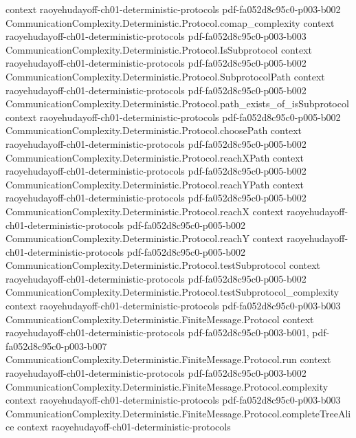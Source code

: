 \begin{lemma}
  {context}
  {raoyehudayoff-ch01-deterministic-protocols}
  {pdf-fa052d8c95c0-p003-b002}
\proofstep
  {CommunicationComplexity.Deterministic.Protocol.comap_complexity}
  {context}
  {raoyehudayoff-ch01-deterministic-protocols}
  {pdf-fa052d8c95c0-p003-b003}
\proofstep
  {CommunicationComplexity.Deterministic.Protocol.IsSubprotocol}
  {context}
  {raoyehudayoff-ch01-deterministic-protocols}
  {pdf-fa052d8c95c0-p005-b002}
\proofstep
  {CommunicationComplexity.Deterministic.Protocol.SubprotocolPath}
  {context}
  {raoyehudayoff-ch01-deterministic-protocols}
  {pdf-fa052d8c95c0-p005-b002}
\proofstep
  {CommunicationComplexity.Deterministic.Protocol.path_exists_of_isSubprotocol}
  {context}
  {raoyehudayoff-ch01-deterministic-protocols}
  {pdf-fa052d8c95c0-p005-b002}
\proofstep
  {CommunicationComplexity.Deterministic.Protocol.choosePath}
  {context}
  {raoyehudayoff-ch01-deterministic-protocols}
  {pdf-fa052d8c95c0-p005-b002}
\proofstep
  {CommunicationComplexity.Deterministic.Protocol.reachXPath}
  {context}
  {raoyehudayoff-ch01-deterministic-protocols}
  {pdf-fa052d8c95c0-p005-b002}
\proofstep
  {CommunicationComplexity.Deterministic.Protocol.reachYPath}
  {context}
  {raoyehudayoff-ch01-deterministic-protocols}
  {pdf-fa052d8c95c0-p005-b002}
\proofstep
  {CommunicationComplexity.Deterministic.Protocol.reachX}
  {context}
  {raoyehudayoff-ch01-deterministic-protocols}
  {pdf-fa052d8c95c0-p005-b002}
\proofstep
  {CommunicationComplexity.Deterministic.Protocol.reachY}
  {context}
  {raoyehudayoff-ch01-deterministic-protocols}
  {pdf-fa052d8c95c0-p005-b002}
\proofstep
  {CommunicationComplexity.Deterministic.Protocol.testSubprotocol}
  {context}
  {raoyehudayoff-ch01-deterministic-protocols}
  {pdf-fa052d8c95c0-p005-b002}
\proofstep
  {CommunicationComplexity.Deterministic.Protocol.testSubprotocol_complexity}
  {context}
  {raoyehudayoff-ch01-deterministic-protocols}
  {pdf-fa052d8c95c0-p003-b003}
\proofstep
  {CommunicationComplexity.Deterministic.FiniteMessage.Protocol}
  {context}
  {raoyehudayoff-ch01-deterministic-protocols}
  {pdf-fa052d8c95c0-p003-b001,
    pdf-fa052d8c95c0-p003-b007}
\proofstep
  {CommunicationComplexity.Deterministic.FiniteMessage.Protocol.run}
  {context}
  {raoyehudayoff-ch01-deterministic-protocols}
  {pdf-fa052d8c95c0-p003-b002}
\proofstep
  {CommunicationComplexity.Deterministic.FiniteMessage.Protocol.complexity}
  {context}
  {raoyehudayoff-ch01-deterministic-protocols}
  {pdf-fa052d8c95c0-p003-b003}
\proofstep
  {CommunicationComplexity.Deterministic.FiniteMessage.Protocol.completeTreeAlice}
  {context}
  {raoyehudayoff-ch01-deterministic-protocols}

\end{lemma}
